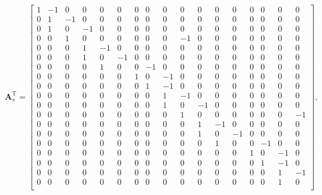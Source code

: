 \documentclass{article}
\def\T{\mathrm{T}}
\begin{document}
\begin{equation}
    \bm{A}_s^\T = 
    \begin{bmatrix}
        1 &-1 & 0 & 0 & 0 & 0 & 0 & 0 & 0 & 0 & 0 & 0 & 0 & 0 & 0 & 0 & 0 \\
        0 & 1 &-1 & 0 & 0 & 0 & 0 & 0 & 0 & 0 & 0 & 0 & 0 & 0 & 0 & 0 & 0 \\
        0 & 1 & 0 &-1 & 0 & 0 & 0 & 0 & 0 & 0 & 0 & 0 & 0 & 0 & 0 & 0 & 0 \\
        0 & 0 & 1 & 0 & 0 & 0 & 0 & 0 & 0 &-1 & 0 & 0 & 0 & 0 & 0 & 0 & 0 \\
        0 & 0 & 0 & 1 &-1 & 0 & 0 & 0 & 0 & 0 & 0 & 0 & 0 & 0 & 0 & 0 & 0 \\
        0 & 0 & 0 & 1 & 0 &-1 & 0 & 0 & 0 & 0 & 0 & 0 & 0 & 0 & 0 & 0 & 0 \\
        0 & 0 & 0 & 0 & 1 & 0 & 0 &-1 & 0 & 0 & 0 & 0 & 0 & 0 & 0 & 0 & 0 \\
        0 & 0 & 0 & 0 & 0 & 0 & 1 & 0 &-1 & 0 & 0 & 0 & 0 & 0 & 0 & 0 & 0 \\
        0 & 0 & 0 & 0 & 0 & 0 & 0 & 1 &-1 & 0 & 0 & 0 & 0 & 0 & 0 & 0 & 0 \\
        0 & 0 & 0 & 0 & 0 & 0 & 0 & 0 & 1 &-1 & 0 & 0 & 0 & 0 & 0 & 0 & 0 \\
        0 & 0 & 0 & 0 & 0 & 0 & 0 & 0 & 1 & 0 &-1 & 0 & 0 & 0 & 0 & 0 & 0 \\
        0 & 0 & 0 & 0 & 0 & 0 & 0 & 0 & 0 & 1 & 0 & 0 & 0 & 0 & 0 & 0 &-1 \\
        0 & 0 & 0 & 0 & 0 & 0 & 0 & 0 & 0 & 0 & 1 &-1 & 0 & 0 & 0 & 0 & 0 \\
        0 & 0 & 0 & 0 & 0 & 0 & 0 & 0 & 0 & 0 & 1 & 0 &-1 & 0 & 0 & 0 & 0 \\
        0 & 0 & 0 & 0 & 0 & 0 & 0 & 0 & 0 & 0 & 0 & 1 & 0 & 0 &-1 & 0 & 0 \\
        0 & 0 & 0 & 0 & 0 & 0 & 0 & 0 & 0 & 0 & 0 & 0 & 0 & 1 & 0 &-1 & 0 \\
        0 & 0 & 0 & 0 & 0 & 0 & 0 & 0 & 0 & 0 & 0 & 0 & 0 & 0 & 1 &-1 & 0 \\
        0 & 0 & 0 & 0 & 0 & 0 & 0 & 0 & 0 & 0 & 0 & 0 & 0 & 0 & 0 & 1 &-1 \\
        0 & 0 & 0 & 0 & 0 & 0 & 0 & 0 & 0 & 0 & 0 & 0 & 0 & 0 & 0 & 1 & 0 \\
    \end{bmatrix},
\end{equation}
\end{document}
